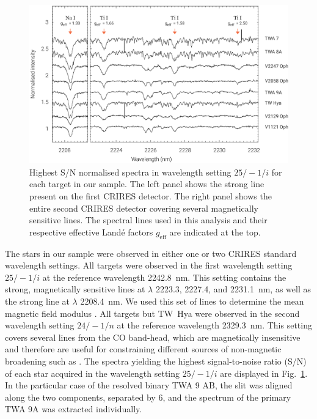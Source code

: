\documentclass{aa}
\begin{document}
\begin{figure}
    \centering
    \includegraphics[width=2.0\columnwidth]{tts-spec.eps}
    \caption{
        Highest S/N normalised spectra in wavelength setting $25/-1/i$ for each target in our sample. The left panel shows the strong  line present on the first CRIRES detector. The right panel shows the entire second CRIRES detector covering several magnetically sensitive  lines. The spectral lines used in this analysis and their respective effective Land\'e factors $g_{\text{eff}}$ are indicated at the top.
    }
    \label{figure:spec}
    \end{figure}
The stars in our sample were observed in either one or two CRIRES standard wavelength settings. All targets were observed in the first wavelength setting $25/-1/i$ at the reference wavelength 2242.8~nm. This setting contains the strong, magnetically sensitive  lines at $\lambda$ 2223.3, 2227.4, and 2231.1~nm, as well as the strong  line at $\lambda$ 2208.4~nm. We used this set of lines to determine the mean magnetic field modulus {\bb}. All targets but TW~Hya were observed in the second wavelength setting $24/-1/n$ at the reference wavelength 2329.3~nm. This setting covers several lines from the CO band-head, which are magnetically insensitive and therefore are useful for constraining different sources of non-magnetic broadening such as {\vsini}. The spectra yielding the highest signal-to-noise ratio (S/N) of each star acquired in the wavelength setting $25/-1/i$ are displayed in Fig.~\ref{figure:spec}. In the particular case of the resolved binary TWA 9 AB, the slit was aligned along the two components, separated by 6\arcsec, and the spectrum of the primary TWA 9A was extracted individually.
\end{document}
